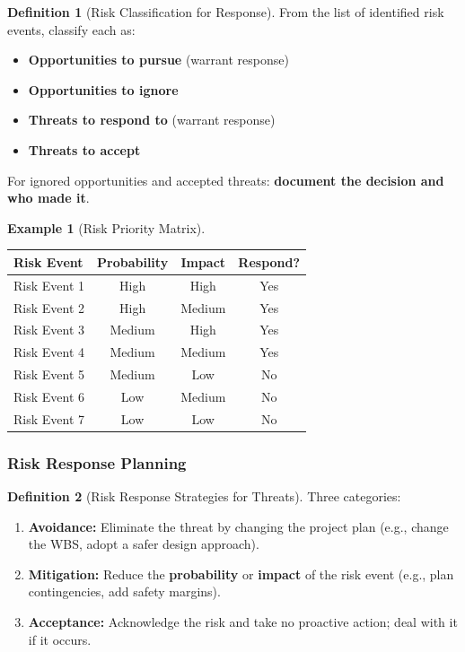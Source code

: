 \documentclass[11pt,a4paper]{article}
\theoremstyle{definition}
\newtheorem{definition}{Definition}[section]
\newtheorem{example}{Example}[section]
\theoremstyle{plain}
\begin{document}
\begin{definition}[Risk Classification for Response]
From the list of identified risk events, classify each as:
\begin{itemize}[nosep]
  \item \textbf{Opportunities to pursue} (warrant response)
  \item \textbf{Opportunities to ignore}
  \item \textbf{Threats to respond to} (warrant response)
  \item \textbf{Threats to accept}
\end{itemize}
For ignored opportunities and accepted threats: \textbf{document the decision and who made it}.
\end{definition}

\begin{example}[Risk Priority Matrix]
~\\
\begin{tabular}{l c c c}
\toprule
\textbf{Risk Event} & \textbf{Probability} & \textbf{Impact} & \textbf{Respond?} \\
\midrule
Risk Event 1 & High   & High   & Yes \\
Risk Event 2 & High   & Medium & Yes \\
Risk Event 3 & Medium & High   & Yes \\
Risk Event 4 & Medium & Medium & Yes \\
Risk Event 5 & Medium & Low    & No  \\
Risk Event 6 & Low    & Medium & No  \\
Risk Event 7 & Low    & Low    & No  \\
\bottomrule
\end{tabular}
\end{example}

\subsubsection{Risk Response Planning}

\begin{definition}[Risk Response Strategies for Threats]
Three categories:
\begin{enumerate}[nosep, label=\arabic*.]
  \item \textbf{Avoidance:} Eliminate the threat by changing the project plan (e.g., change the WBS, adopt a safer design approach).
  \item \textbf{Mitigation:} Reduce the \textbf{probability} or \textbf{impact} of the risk event (e.g., plan contingencies, add safety margins).
  \item \textbf{Acceptance:} Acknowledge the risk and take no proactive action; deal with it if it occurs.
\end{enumerate}
\end{definition}
\end{document}
